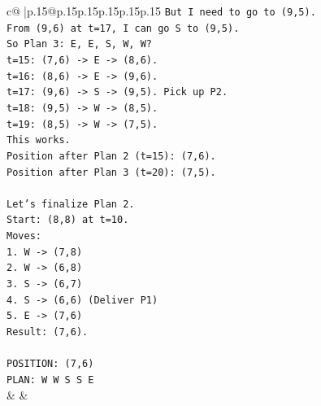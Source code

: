\documentclass{article}
\begin{document}
{\begin{supertabular}{c@{$\;$}|p{.15\linewidth}@{}p{.15\linewidth}p{.15\linewidth}p{.15\linewidth}p{.15\linewidth}p{.15\linewidth}}
{{{\texttt{But I need to go to (9,5).} \\
\texttt{From (9,6) at t=17, I can go S to (9,5).} \\
\texttt{So Plan 3: E, E, S, W, W?} \\
\texttt{t=15: (7,6) {-}> E {-}> (8,6).} \\
\texttt{t=16: (8,6) {-}> E {-}> (9,6).} \\
\texttt{t=17: (9,6) {-}> S {-}> (9,5). Pick up P2.} \\
\texttt{t=18: (9,5) {-}> W {-}> (8,5).} \\
\texttt{t=19: (8,5) {-}> W {-}> (7,5).} \\
\texttt{This works.} \\
\texttt{Position after Plan 2 (t=15): (7,6).} \\
\texttt{Position after Plan 3 (t=20): (7,5).} \\
\\ 
\texttt{Let's finalize Plan 2.} \\
\texttt{Start: (8,8) at t=10.} \\
\texttt{Moves:} \\
\texttt{1. W {-}> (7,8)} \\
\texttt{2. W {-}> (6,8)} \\
\texttt{3. S {-}> (6,7)} \\
\texttt{4. S {-}> (6,6) (Deliver P1)} \\
\texttt{5. E {-}> (7,6)} \\
\texttt{Result: (7,6).} \\
\\ 
\texttt{POSITION: (7,6)} \\
\texttt{PLAN: W W S S E} \\
            }
        }
    }
    & & \\ \\


\end{supertabular}}
\end{document}
